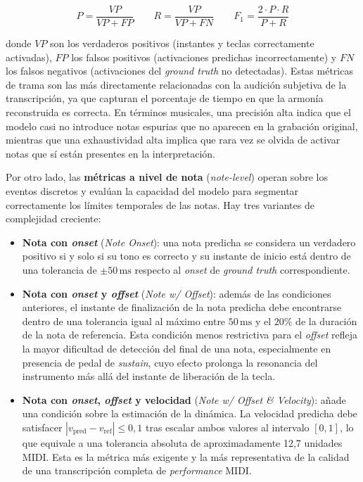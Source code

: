 \documentclass[11pt,spanish,listoffigures,listoftables]{tfgetsinf}
\begin{document}
\begin{equation}
  P = \frac{VP}{VP + FP} \qquad
  R = \frac{VP}{VP + FN} \qquad
  F_1 = \frac{2 \cdot P \cdot R}{P + R}
  \label{eq:prf1}
\end{equation}

\noindent donde $VP$ son los verdaderos positivos (instantes y teclas correctamente activadas),
$FP$ los falsos positivos (activaciones predichas incorrectamente) y $FN$ los falsos negativos
(activaciones del \textit{ground truth} no detectadas). Estas métricas de trama son las más
directamente relacionadas con la audición subjetiva de la transcripción, ya que capturan el
porcentaje de tiempo en que la armonía reconstruida es correcta.
En términos musicales, una precisión alta indica que el modelo casi no introduce notas espurias que no aparecen en la grabación original, mientras que una exhaustividad alta implica que rara vez se olvida de activar notas que sí están presentes en la interpretación.



Por otro lado, las \textbf{métricas a nivel de nota} (\textit{note-level}) operan sobre los eventos discretos y evalúan la capacidad del modelo para segmentar correctamente los límites temporales de las notas. Hay tres variantes de complejidad creciente:

\begin{itemize}
  \item \textbf{Nota con \textit{onset}} (\textit{Note Onset}): una nota predicha se considera
  un verdadero positivo si y solo si su tono es correcto y su instante de inicio está dentro
  de una tolerancia de $\pm 50\,\mathrm{ms}$ respecto al \textit{onset} de \textit{ground
  truth} correspondiente.

  \item \textbf{Nota con \textit{onset} y \textit{offset}} (\textit{Note w/ Offset}): además
  de las condiciones anteriores, el instante de finalización de la nota predicha debe encontrarse
  dentro de una tolerancia igual al máximo entre $50\,\mathrm{ms}$ y el $20\%$ de la
  duración de la nota de referencia. Esta condición menos restrictiva para el \textit{offset} refleja
  la mayor dificultad de detección del final de una nota, especialmente en presencia de pedal
  de \textit{sustain}, cuyo efecto prolonga la resonancia del instrumento más allá del instante de
  liberación de la tecla.

  \item \textbf{Nota con \textit{onset}, \textit{offset} y velocidad} (\textit{Note w/ Offset
  \& Velocity}): añade una condición sobre la estimación de la dinámica. La velocidad predicha
  debe satisfacer $|v_{\text{pred}} - v_{\text{ref}}| \leq 0{,}1$ tras escalar ambos valores
  al intervalo $[0, 1]$, lo que equivale a una tolerancia absoluta de aproximadamente 12{,}7
  unidades MIDI. Esta es la métrica más exigente y la más representativa de la calidad de una
  transcripción completa de \textit{performance} MIDI.
\end{itemize}
\end{document}
